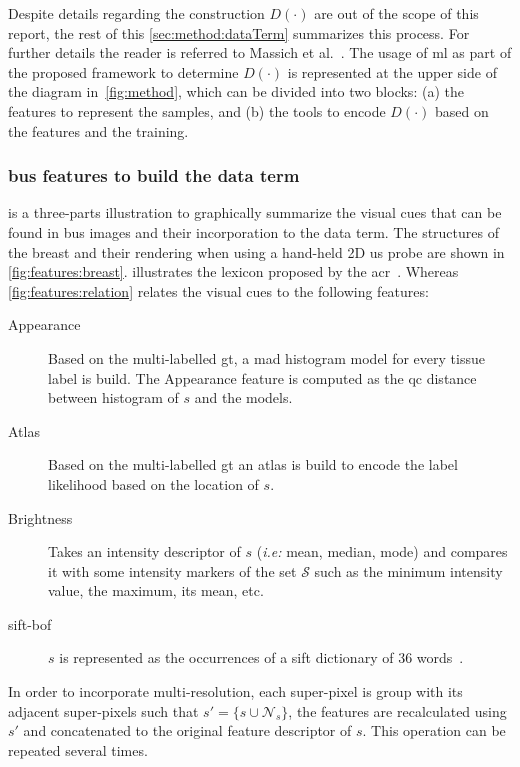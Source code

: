 Despite details regarding the construction $D(\cdot)$ are out of the scope of this report, the rest of this \cref{sec:method:dataTerm} summarizes this process.
For further details the reader is referred to Massich et al.~\cite{massich2013phd}.
The usage of \ac{ml} as part of the proposed framework to determine $D(\cdot)$ is represented at the upper side of the diagram in~\cref{fig:method},
which can be divided into two blocks:
(a) the features to represent the samples,
and (b) the tools to encode $D(\cdot)$ based on the features and the training. 

\subsubsection{\ac{bus} features to build the data term} \label{sec:method:dterm:feat}
 is a three-parts illustration to graphically summarize the visual cues that can be found in \ac{bus} images and their incorporation to the data term.
The structures of the breast and their rendering when using a hand-held 2D \ac{us} probe are shown in \cref{fig:features:breast}.
 illustrates the lexicon proposed by the \ac{acr}~\cite{biradsus}.
Whereas \cref{fig:features:relation} relates the visual cues to the following features:

\begin{description}
  \item[Appearance] 
    Based on the multi-labelled \ac{gt}, a \ac{mad} histogram model for every tissue label is build. The Appearance feature is computed as the \ac{qc} distance between histogram of $s$ and the models.
  \item[Atlas] 
    Based on the multi-labelled \ac{gt} an atlas is build to encode the label likelihood based on the location of $s$.
  \item[Brightness] 
    Takes an intensity descriptor of $s$ (\emph{i.e:} mean, median, mode) and compares it with some intensity markers of the set $\mathcal{S}$ such as the minimum intensity value, the maximum, its mean, etc.
  \item[\ac{sift}-\ac{bof}]
    $s$ is represented as the occurrences of a \ac{sift} dictionary of 36 words~\cite{massich2014sift}.
\end{description}

In order to incorporate multi-resolution, each super-pixel is group with its adjacent super-pixels such that $s' = \{s \cup \mathcal{N}_{s}\}$, the features are recalculated using $s'$ and concatenated to the original feature descriptor of $s$.
This operation can be repeated several times.

